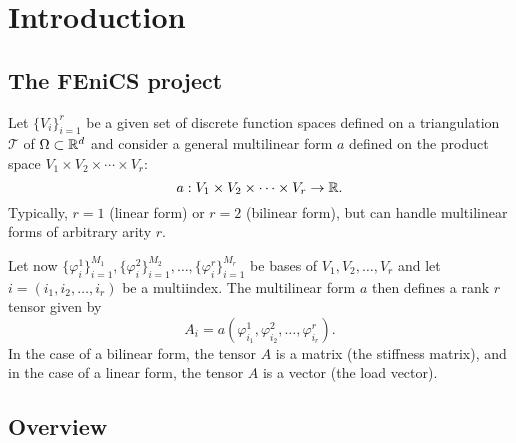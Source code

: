 \chapter{Introduction}
\label{introduction}

\section{The FEniCS project}



Let $\{V_i\}_{i=1}^r$ be a given set of discrete function
spaces defined on a triangulation $\mathcal{T}$ of $\Omega \subset
\mathbb{R}^d$ and consider a general multilinear form $a$ defined on the
product space $V_1 \times V_2 \times \cdots \times V_r$:
\begin{equation}
  a : V_1 \times V_2 \times \cdots \times V_r \rightarrow \mathbb{R}.
\end{equation}
Typically, $r = 1$ (linear form) or $r = 2$ (bilinear form), but
\ffc{} can handle multilinear forms of arbitrary arity $r$.

Let now
$\{\varphi_i^1\}_{i=1}^{M_1},
 \{\varphi_i^2\}_{i=1}^{M_2}, \ldots,
 \{\varphi_i^r\}_{i=1}^{M_r}$
be bases of $V_1, V_2, \ldots, V_r$ and let $i = (i_1, i_2, \ldots,
i_r)$ be a multiindex. The multilinear form $a$ then
defines a rank $r$ tensor given by
\begin{equation}
  A_i = a(\varphi_{i_1}^1, \varphi_{i_2}^2, \ldots, \varphi_{i_r}^r).
\end{equation}
In the case of a bilinear form, the tensor $A$ is a matrix (the
stiffness matrix), and in the case of a linear form, the tensor $A$ is
a vector (the load vector).


\section{Overview}

